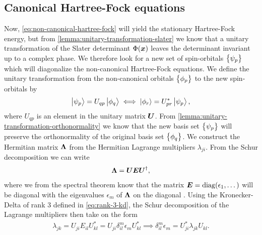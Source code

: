         \subsection{Canonical Hartree-Fock equations}
            Now, \autoref{eq:non-canonical-hartree-fock} will yield the
            stationary Hartree-Fock energy, but from
            \autoref{lemma:unitary-transformation-slater} we know that a unitary
            transformation of the Slater determinant $\Phi(\boldsymbol{x})$ leaves the
            determinant invariant up to a complex phase.
            We therefore look for a new set of spin-orbitals $\left\{ \psi_p \right\}$
            which will diagonalize the non-canonical Hartree-Fock equations.
            We define the unitary transformation from the non-canonical orbitals
            $\left\{ \phi_p \right\}$ to the new spin-orbitals by
            \begin{align}
                \ket{\psi_p} = U_{qp}\ket{\phi_q}
                \iff
                \ket{\phi_r} = U^{*}_{pr}\ket{\psi_p},
            \end{align}
            where $U_{qp}$ is an element in the unitary matrix $\boldsymbol{U}$.
            From \autoref{lemma:unitary-transformation-orthonormality} we know
            that the new basis set $\left\{ \psi_{p} \right\}$ will preserve the
            orthonormality of the original basis set $\left\{ \phi_q \right\}$.
            We construct the Hermitian matrix $\boldsymbol{\Lambda}$ from the Hermitian
            Lagrange multipliers $\lambda_{ji}$.
            From the Schur decomposition \cite{mat-inf4130} we can write
            \begin{align}
                \boldsymbol{\Lambda} = \boldsymbol{U} \boldsymbol{E} \boldsymbol{U}^{\dagger},
            \end{align}
            where we from the spectral theorem know that the matrix
            $\boldsymbol{E} = \operatorname{diag}(\epsilon_1, \dots)$ will be diagonal with the
            eigenvalues $\epsilon_m$ of $\boldsymbol{\Lambda}$ on the diagonal
            \cite{mat-inf4130}.
            Using the Kronecker-Delta of rank 3 defined in
            \autoref{eq:rank-3-kd}, the Schur decomposition of the Lagrange
            multipliers then take on the form
            \begin{align}
                \lambda_{jk} = U_{ji} E_{il} U^{*}_{kl}
                = U_{ji} \delta^{m}_{il} \epsilon_m U^{*}_{kl}
                \implies
                \delta^{m}_{il} \epsilon_m
                = U^{*}_{ji} \lambda_{jk} U_{kl}.
            \end{align}
